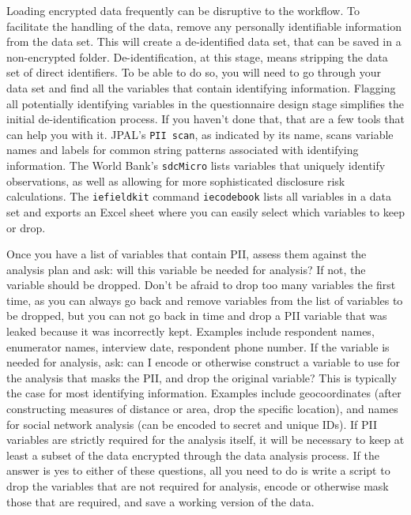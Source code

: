 Loading encrypted data frequently can be disruptive to the workflow.
To facilitate the handling of the data, remove any personally identifiable information from the data set.
This will create a de-identified data set, that can be saved in a non-encrypted folder. 
De-identification,
at this stage, means stripping the data set of direct identifiers.
To be able to do so, you will need to go through your data set and
find all the variables that contain identifying information.
Flagging all potentially identifying variables in the questionnaire design stage 
simplifies the initial de-identification process.
If you haven't done that, that are a few tools that can help you with it.
JPAL's \texttt{PII scan}, as indicated by its name,
scans variable names and labels for common string patterns associated with identifying information.
The World Bank's \texttt{sdcMicro}
lists variables that uniquely identify observations,
as well as allowing for more sophisticated disclosure risk calculations.
The \texttt{iefieldkit} command \texttt{iecodebook}
lists all variables in a data set and exports an Excel sheet
where you can easily select which variables to keep or drop. 

Once you have a list of variables that contain PII, 
assess them against the analysis plan and ask: 
will this variable be needed for analysis?
If not, the variable should be dropped. 
Don't be afraid to drop too many variables the first time, 
as you can always go back and remove variables from the list of variables to be dropped,
but you can not go back in time and drop a PII variable that was leaked 
because it was incorrectly kept.
Examples include respondent names, enumerator names, interview date, respondent phone number.
If the variable is needed for analysis, ask: 
can I encode or otherwise construct a variable to use for the analysis that masks the PII, 
and drop the original variable?
This is typically the case for most identifying information.
Examples include geocoordinates 
(after constructing measures of distance or area, 
drop the specific location), 
and names for social network analysis (can be encoded to secret and unique IDs).
If PII variables are strictly required for the analysis itself, 
it will be necessary to keep at least a subset of the data encrypted through the data analysis process.
If the answer is yes to either of these questions, 
all you need to do is write a script to drop the variables that are not required for analysis, 
encode or otherwise mask those that are required, 
and save a working version of the data.

